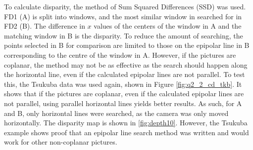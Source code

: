 \documentclass[a4paper, 10pt, conference]{ieeeconf}
\begin{document}
To calculate disparity, the method of Sum Squared Differences (SSD) was used. FD1 (A) is split into windows, and the most similar window in searched for in FD2 (B). The difference in $x$ values of the centers of the window in A and the matching window in B is the disparity. To reduce the amount of searching, the points selected in B for comparison are limited to those on the epipolar line in B corresponding to the centre of the window in A. However, if the pictures are coplanar, the method may not be as effective as the search should happen along the horizontal line, even if the calculated epipolar lines are not parallel. To test this, the Tsukuba data was used again, shown in Figure \ref{fig:q2_2_cd_tkb}. It shows that if the pictures are coplanar, even if the calculated epipolar lines are not parallel, using parallel horizontal lines yields better results. As such, for A and B, only horizontal lines were searched, as the camera was only moved horizontally. The disparity map is shown in \ref{fig:depth10}. However, the Tsukuba example shows proof that an epipolar line search method was written and would work for other non-coplanar pictures.
\end{document}
